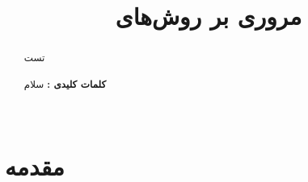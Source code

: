 \documentclass[12pt,a4paper,twocolumn]{article}
\title{\textbf{مروری بر روش‌های \lr{coopertive beamforming}}}
\author{\lr{Mohammad Raziei{\orcidlink{0009-0007-3346-9365}}}}
\date{}
\begin{document}
	
	
	\maketitle
	
	
\renewcommand{\abstractname}{چکیده}
\vspace{-4em}
\begin{abstract}
	\begin{strip}
		تست
		\\
		\\
		\textbf{کلمات کلیدی : }
	سلام
		\\
		\\
	\end{strip}  
\end{abstract}
	


\section{مقدمه}


\cite{10058895}
	



\nocite{*}

\end{document}
